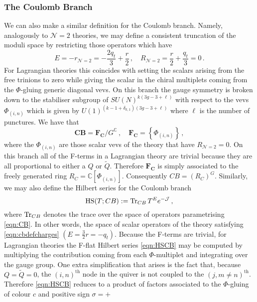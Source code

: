 \documentclass[main.tex]{subfiles}
\begin{document}
\subsubsection{The Coulomb Branch}\label{sec:CB}
We can also make a similar definition for the Coulomb branch. Namely, analogously to $\mathcal{N}=2$ theories, we may define a consistent truncation of the moduli space by restricting those operators which have 
\begin{equation} \label{eqn:cbdefcharges}
E=-r_{\mathcal{N}=2}=-\frac{2q_t}{3}+\frac{r}{2}\,,\quad R_{\mathcal{N}=2}=\frac{r}{2}+\frac{q_t}{3}=0 \, .
\end{equation} For Lagrangian theories this coincides with setting the scalars arising from the free trinions to zero while giving the scalar in the chiral multiplets coming from the $\Phi$-gluing generic diagonal vevs. On this branch the gauge symmetry is broken down to the stabiliser subgroup of $SU(N)^{k(3g-3+\ell)}$ with respect to the vevs $\Phi_{(i,n)}$ which is given by $U(1)^{(k-1+\delta_{k,1})(3g-3+\ell)}$ where $\ell$ is the number of punctures. We have that
\begin{equation}\label{eqn:CB}
\mathbf{CB}=\mathbf{F_C}/G^{\mathbb{C}}\,,\quad \mathbf{F_C}=\left\{\Phi_{(i,n)}\right\}\,,
\end{equation}
where the $\Phi_{(i,n)}$ are those scalar vevs of the theory that have $R_{\mathcal{N}=2}=0$. On this branch all of the F-terms in a Lagrangian theory are trivial because they are all proportional to either a $Q$ or $\widetilde{Q}$. Therefore $\mathbf{F_C}$ is simply associated to the freely generated ring $R_C=\mathbb{C}[\Phi_{(i,n)}]$. Consequently $CB=(R_C)^G$.
Similarly, we may also define the Hilbert series for the Coulomb branch
\begin{equation}\label{eqn:HSCB}
\textrm{HS}(T;CB):=\operatorname{Tr}_{CB}T^Ee^{-\mathcal{J}}\,,
\end{equation}
where $\operatorname{Tr}_{CB}$ denotes the trace over the space of operators parametrising \eqref{eqn:CB}. In other words, the space of scalar operators of the theory satisfying \eqref{eqn:cbdefcharges} $(E=\frac{3}{2}r=-q_t)$. Because the F-terms are trivial, for Lagrangian theories the F-flat Hilbert series \eqref{eqn:HSCB} may be computed by multiplying the contribution coming from each $\Phi$-multiplet and integrating over the gauge group. One extra simplification that arises is the fact that, because $Q=\widetilde{Q}=0$, the $(i,n)^{\text{th}}$ node in the quiver is not coupled to the $(j,m\neq n)^{\text{th}}$. Therefore \eqref{eqn:HSCB} reduces to a product of factors associated to the $\Phi$-gluing of colour $c$ and positive sign $\sigma=+$
\end{document}
